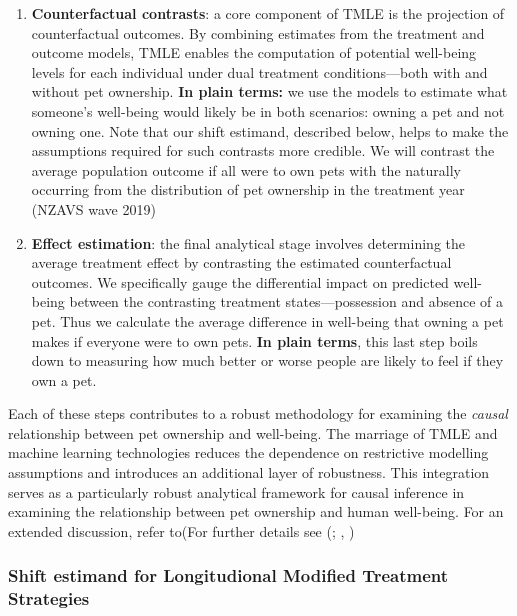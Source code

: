 \documentclass[
  singlecolumn,
  9pt]{article}
\begin{document}
\begin{enumerate}
\item
  \textbf{Counterfactual contrasts}: a core component of TMLE is the
  projection of counterfactual outcomes. By combining estimates from the
  treatment and outcome models, TMLE enables the computation of
  potential well-being levels for each individual under dual treatment
  conditions---both with and without pet ownership. \textbf{In plain
  terms:} we use the models to estimate what someone's well-being would
  likely be in both scenarios: owning a pet and not owning one. Note
  that our shift estimand, described below, helps to make the
  assumptions required for such contrasts more credible. We will
  contrast the average population outcome if all were to own pets with
  the naturally occurring from the distribution of pet ownership in the
  treatment year (NZAVS wave 2019)
\item
  \textbf{Effect estimation}: the final analytical stage involves
  determining the average treatment effect by contrasting the estimated
  counterfactual outcomes. We specifically gauge the differential impact
  on predicted well-being between the contrasting treatment
  states---possession and absence of a pet. Thus we calculate the
  average difference in well-being that owning a pet makes if everyone
  were to own pets. \textbf{In plain terms}, this last step boils down
  to measuring how much better or worse people are likely to feel if
  they own a pet.
\end{enumerate}

Each of these steps contributes to a robust methodology for examining
the \emph{causal} relationship between pet ownership and well-being. The
marriage of TMLE and machine learning technologies reduces the
dependence on restrictive modelling assumptions and introduces an
additional layer of robustness. This integration serves as a
particularly robust analytical framework for causal inference in
examining the relationship between pet ownership and human well-being.
For an extended discussion, refer to(For further details see
(;
,
)

\subsubsection{Shift estimand for Longitudional Modified Treatment
Strategies}\label{shift-estimand-for-longitudional-modified-treatment-strategies}
\end{document}
